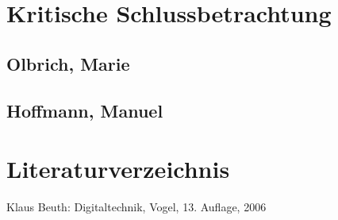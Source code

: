 \documentclass[a4paper, 11pt, fleqn, DIV=10, twoside, BCOR=10mm]{scrreprt}
\begin{document}
\chapter{Kritische Schlussbetrachtung}
\section{Olbrich, Marie}
 
\section{Hoffmann, Manuel}
 
\chapter{Literaturverzeichnis}
Klaus Beuth: Digitaltechnik, Vogel, 13. Auflage, 2006



\end{document}
